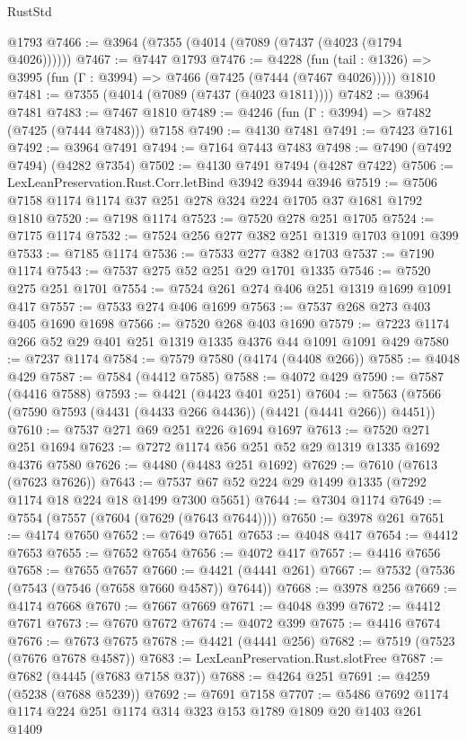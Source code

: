 \begin{lexlean}{RustStd}
\begin{coremodule}
{\begin{coremodule}
{{{{{{{{{{{{{{{{{{{{{{{{{{{{{{{{{{{{{{    @1793
@7466 := @3964 (@7355 (@4014 (@7089 (@7437 (@4023 (@1794 @4026))))))
@7467 := @7447 @1793
@7476 := @4228
    (fun (tail : @1326) => @3995 (fun (Γ : @3994) => @7466 (@7425 (@7444 (@7467 @4026)))))
    @1810
@7481 := @7355 (@4014 (@7089 (@7437 (@4023 @1811))))
@7482 := @3964 @7481
@7483 := @7467 @1810
@7489 := @4246 (fun (Γ : @3994) => @7482 (@7425 (@7444 @7483))) @7158
@7490 := @4130 @7481
@7491 := @7423 @7161
@7492 := @3964 @7491
@7494 := @7164 @7443 @7483
@7498 := @7490 (@7492 @7494) (@4282 @7354)
@7502 := @4130 @7491 @7494 (@4287 @7422)
@7506 := LexLeanPreservation.Rust.Corr.letBind @3942 @3944 @3946
@7519 := @7506 @7158 @1174 @1174 @37 @251 @278 @324 @224 @1705 @37 @1681 @1792 @1810
@7520 := @7198 @1174
@7523 := @7520 @278 @251 @1705
@7524 := @7175 @1174
@7532 := @7524 @256 @277 @382 @251 @1319 @1703 @1091 @399
@7533 := @7185 @1174
@7536 := @7533 @277 @382 @1703
@7537 := @7190 @1174
@7543 := @7537 @275 @52 @251 @29 @1701 @1335
@7546 := @7520 @275 @251 @1701
@7554 := @7524 @261 @274 @406 @251 @1319 @1699 @1091 @417
@7557 := @7533 @274 @406 @1699
@7563 := @7537 @268 @273 @403 @405 @1690 @1698
@7566 := @7520 @268 @403 @1690
@7579 := @7223 @1174 @266 @52 @29 @401 @251 @1319 @1335 @4376 @44 @1091 @1091 @429
@7580 := @7237 @1174
@7584 := @7579 @7580 (@4174 (@4408 @266))
@7585 := @4048 @429
@7587 := @7584 (@4412 @7585)
@7588 := @4072 @429
@7590 := @7587 (@4416 @7588)
@7593 := @4421 (@4423 @401 @251)
@7604 := @7563 (@7566 (@7590 @7593 (@4431 (@4433 @266 @4436)) (@4421 (@4441 @266)) @4451))
@7610 := @7537 @271 @69 @251 @226 @1694 @1697
@7613 := @7520 @271 @251 @1694
@7623 := @7272 @1174 @56 @251 @52 @29 @1319 @1335 @1692 @4376 @7580
@7626 := @4480 (@4483 @251 @1692)
@7629 := @7610 (@7613 (@7623 @7626))
@7643 := @7537 @67 @52 @224 @29 @1499 @1335 (@7292 @1174 @18 @224 @18 @1499 @7300 @5651)
@7644 := @7304 @1174
@7649 := @7554 (@7557 (@7604 (@7629 (@7643 @7644))))
@7650 := @3978 @261
@7651 := @4174 @7650
@7652 := @7649 @7651
@7653 := @4048 @417
@7654 := @4412 @7653
@7655 := @7652 @7654
@7656 := @4072 @417
@7657 := @4416 @7656
@7658 := @7655 @7657
@7660 := @4421 (@4441 @261)
@7667 := @7532 (@7536 (@7543 (@7546 (@7658 @7660 @4587)) @7644))
@7668 := @3978 @256
@7669 := @4174 @7668
@7670 := @7667 @7669
@7671 := @4048 @399
@7672 := @4412 @7671
@7673 := @7670 @7672
@7674 := @4072 @399
@7675 := @4416 @7674
@7676 := @7673 @7675
@7678 := @4421 (@4441 @256)
@7682 := @7519 (@7523 (@7676 @7678 @4587))
@7683 := LexLeanPreservation.Rust.slotFree
@7687 := @7682 (@4445 (@7683 @7158 @37))
@7688 := @4264 @251
@7691 := @4259 (@5238 (@7688 @5239))
@7692 := @7691 @7158
@7707 := @5486 @7692 @1174 @1174 @224 @251 @1174 @314 @323 @153 @1789 @1809 @20 @1403 @261 @1409
}}}}}}}}}}}}}}}}}}}}}}}}}}}}}}}}}}}}}}
\end{coremodule}}
\end{coremodule}
\end{lexlean}
